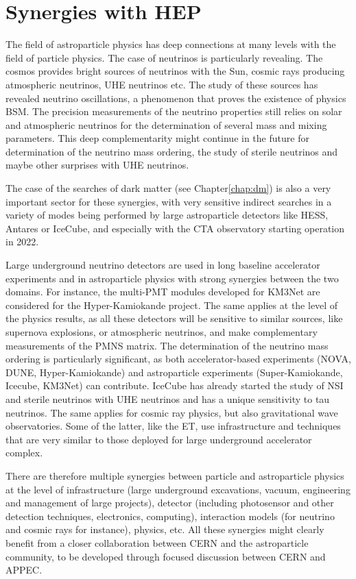 \section{Synergies with HEP}
The field of astroparticle physics has deep connections at many levels with the field of particle physics. The case of neutrinos is particularly revealing. The cosmos provides bright sources of neutrinos with the Sun, cosmic rays producing atmospheric neutrinos, UHE neutrinos etc. The study of these sources has revealed neutrino oscillations, a phenomenon that proves the existence of physics BSM. The precision measurements of the neutrino properties still relies on solar and atmospheric neutrinos for the determination of several mass and mixing parameters. This deep complementarity might continue in the  future for determination of the neutrino mass ordering, the study of sterile neutrinos and maybe other surprises with UHE neutrinos.

The case of the searches of dark matter (see Chapter\ref{chap:dm}) is also a very important sector for these synergies, with very sensitive indirect searches in a 
variety of modes being performed by large astroparticle detectors like HESS, Antares or IceCube, and especially with the CTA observatory starting operation in 2022.

Large underground neutrino detectors are used in long baseline accelerator experiments and in astroparticle physics with strong synergies between the two domains. For instance, the multi-PMT modules developed for KM3Net are considered for the Hyper-Kamiokande project. The same applies at the level of the physics results, as all these detectors will be sensitive to similar sources, like supernova explosions, or atmospheric neutrinos, and make complementary measurements of the PMNS matrix. The determination of the neutrino mass ordering is particularly significant, as both accelerator-based experiments (NOVA, DUNE, Hyper-Kamiokande) and astroparticle experiments (Super-Kamiokande, Icecube, KM3Net) can contribute. 
IceCube has already started the study of NSI and sterile neutrinos with UHE neutrinos and has a unique sensitivity to tau neutrinos.
The same applies for cosmic ray physics, but also gravitational wave observatories. Some of the latter, like the ET, use infrastructure and techniques that are very similar to those deployed for large underground accelerator complex.

There are therefore multiple synergies between particle and astroparticle physics at the level of infrastructure (large underground excavations, vacuum, engineering and management of large projects), detector (including photosensor and other detection techniques, electronics, computing), interaction models (for neutrino and cosmic rays for instance), physics, etc. All these synergies might clearly benefit from a closer collaboration between CERN and the astroparticle community, to be developed through focused discussion between CERN and APPEC.